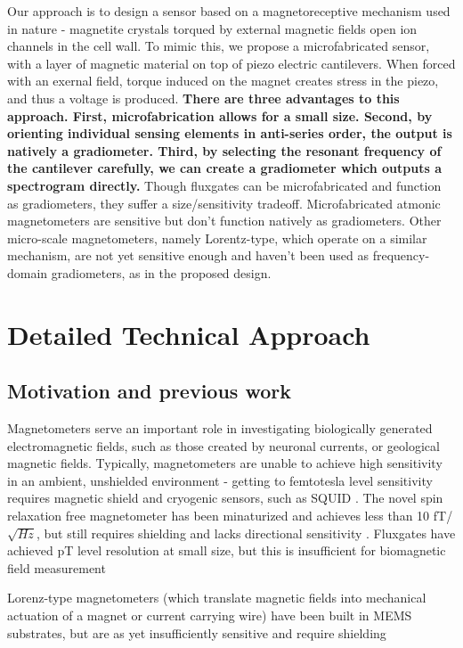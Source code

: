 Our approach is to design a sensor based on a magnetoreceptive mechanism used in nature - magnetite crystals torqued by external magnetic fields open ion channels in the cell wall. To mimic this, we propose a microfabricated sensor, with a layer of magnetic material on top of piezo electric cantilevers. When forced with an exernal field, torque induced on the magnet creates stress in the piezo, and thus a voltage is produced. \textbf{There are three advantages to this approach. First, microfabrication allows for a small size. Second, by orienting individual sensing elements in anti-series order, the output is natively a gradiometer. Third, by selecting the resonant frequency of the cantilever carefully, we can create a gradiometer which outputs a spectrogram directly.} Though fluxgates can be microfabricated and function as gradiometers, they suffer a size/sensitivity tradeoff. Microfabricated atmonic magnetometers are sensitive but don't function natively as gradiometers. Other micro-scale magnetometers, namely Lorentz-type, which operate on a similar mechanism, are not yet sensitive enough and haven't been used as frequency-domain gradiometers, as in the proposed design.

\section{Detailed Technical Approach}

\subsection{Motivation and previous work}

Magnetometers serve an important role in investigating biologically generated electromagnetic fields, such as those created by neuronal currents, or geological magnetic fields. Typically, magnetometers are unable to achieve high sensitivity in an ambient, unshielded environment - getting to femtotesla level sensitivity requires magnetic shield and cryogenic sensors, such as SQUID \cite{lenz2006magnetic}. The novel spin relaxation free magnetometer has been minaturized and achieves less than 10 fT/$\sqrt{Hz}$, but still requires shielding and lacks directional sensitivity \cite{shah2013compact}. Fluxgates have achieved pT level resolution at small size, but this is insufficient for biomagnetic field measurement \cite{sasada2002orthogonal,uchiyama2014highly,sasada2014fundamental} 

Lorenz-type magnetometers (which translate magnetic fields into mechanical actuation of a magnet or current carrying wire) have been built in MEMS substrates, but are as yet insufficiently sensitive and require shielding \cite{sinha201627,kyynarainen20083d,kumar2015ultra,thompson2009parametrically}

